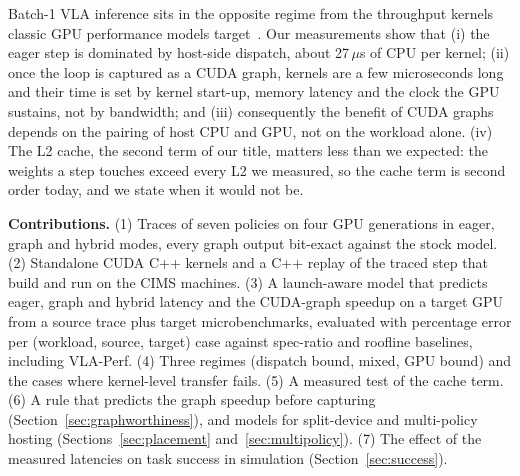 \documentclass[10pt,twocolumn]{article}
\begin{document}
Batch-1 VLA inference sits in the opposite regime from the throughput kernels classic GPU
performance models target~\cite{hongkim,gpuperf}. Our measurements show that (i) the eager step
is dominated by host-side dispatch, about 27\,$\mu$s of CPU per kernel; (ii) once the loop is
captured as a CUDA graph, kernels are a few microseconds long and their time is set by kernel
start-up, memory latency and the clock the GPU sustains, not by bandwidth; and (iii)
consequently the benefit of CUDA graphs depends on the pairing of host CPU and GPU, not on the
workload alone. (iv) The L2 cache, the second term of our title, matters less than we expected:
the weights a step touches exceed every L2 we measured, so the cache term is second order today,
and we state when it would not be.

\textbf{Contributions.} (1) Traces of seven policies on four GPU generations in eager, graph
and hybrid modes, every graph output bit-exact against the stock model. (2) Standalone CUDA C++
kernels and a C++ replay of the traced step that build and run on the CIMS machines. (3) A
launch-aware model that predicts eager, graph and hybrid latency and the CUDA-graph speedup on a
target GPU from a source trace plus target microbenchmarks, evaluated with percentage error per
(workload, source, target) case against spec-ratio and roofline baselines, including VLA-Perf.
(4) Three regimes (dispatch bound, mixed, GPU bound) and the cases where kernel-level transfer
fails. (5) A measured test of the cache term. (6) A rule that predicts the graph speedup before
capturing (Section~\ref{sec:graphworthiness}), and models for split-device and multi-policy
hosting (Sections~\ref{sec:placement} and~\ref{sec:multipolicy}). (7) The effect of the measured
latencies on task success in simulation (Section~\ref{sec:success}).
\end{document}
